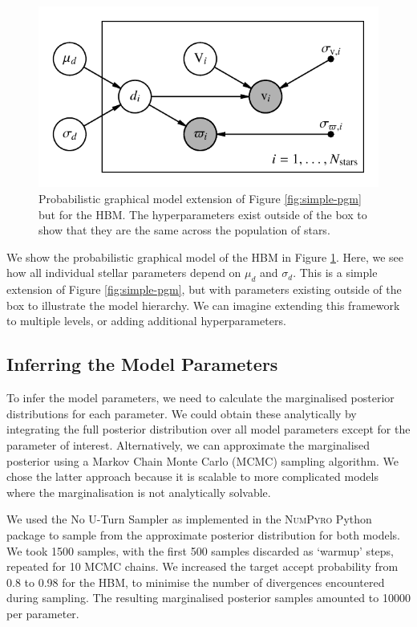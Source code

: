 \begin{figure}[tb]
    \centering
    \includegraphics{figures/hbm-pgm.pdf}
    \caption[Probabilistic graphical model for the hierarchical model]{Probabilistic graphical model extension of Figure \ref{fig:simple-pgm} but for the HBM. The hyperparameters exist outside of the box to show that they are the same across the population of stars.}
    \label{fig:hbm-pgm}
\end{figure}

We show the probabilistic graphical model of the HBM in Figure \ref{fig:hbm-pgm}. Here, we see how all individual stellar parameters depend on \(\mu_d\) and \(\sigma_d\). This is a simple extension of Figure \ref{fig:simple-pgm}, but with parameters existing outside of the box to illustrate the model hierarchy. We can imagine extending this framework to multiple levels, or adding additional hyperparameters.

\subsection{Inferring the Model Parameters}\label{sec:hbm-inf}

To infer the model parameters, we need to calculate the marginalised posterior distributions for each parameter. We could obtain these analytically by integrating the full posterior distribution over all model parameters except for the parameter of interest. Alternatively, we can approximate the marginalised posterior using a Markov Chain Monte Carlo (MCMC) sampling algorithm. We chose the latter approach because it is scalable to more complicated models where the marginalisation is not analytically solvable.

We used the No U-Turn Sampler \citep[NUTS;][]{Hoffman.Gelman2014} as implemented in the \textsc{NumPyro} Python package \citep{Phan.Pradhan.ea2019,Bingham.Chen.ea2019} to sample from the approximate posterior distribution for both models. We took 1500 samples, with the first 500 samples discarded as `warmup' steps, repeated for 10 MCMC chains. We increased the target accept probability from 0.8 to 0.98 for the HBM, to minimise the number of divergences encountered during sampling. The resulting marginalised posterior samples amounted to \num{10000} per parameter.

